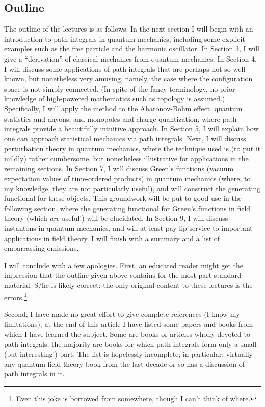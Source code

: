\documentclass[12pt]{article}
\begin{document}
\subsection{Outline}
The outline of the lectures is as follows. In the next section I will
begin with an introduction to path integrals in quantum mechanics,
including some explicit examples such as the free particle and the
harmonic oscillator. In Section 3, I will give a ``derivation'' of
classical mechanics from quantum mechanics. In Section 4, I will
discuss some applications of path integrals that are perhaps not so
well-known, but nonetheless very amusing, namely, the case where the
configuration space is not simply connected. (In spite of the fancy
terminology, no prior knowledge of high-powered mathematics such as
topology is assumed.) Specifically, I will apply the method to the
Aharonov-Bohm effect, quantum statistics and anyons, and monopoles and
charge quantization, where path integrals provide a beautifully
intuitive approach. In Section 5, I will explain how one can approach
statistical mechanics via path integrals. Next, I will discuss
perturbation theory in quantum mechanics, where the technique used is
(to put it mildly) rather cumbersome, but nonetheless
illustrative for applications in the remaining
sections. In Section 7, I will discuss Green's functions (vacuum
expectation values of time-ordered products) in quantum mechanics
(where, to my knowledge, they are not particularly useful), and will
construct the generating functional for these objects. This groundwork
will be put to good use in the following section, where the generating
functional for Green's functions in field theory (which {\em are}
useful!) will be elucidated. In Section 9, I will discuss instantons
in quantum mechanics, and will at least pay lip service to important
applications in field theory. I will finish with a summary and a list of
embarrassing omissions.

\vspace{1cm}
I will conclude with a few apologies.
First, an educated reader might get the impression that the outline
given above contains for the most part standard material. S/he is
likely correct: the only original content to these lectures is the
errors.\footnote{Even this joke is borrowed from somewhere, though
I can't think of where.}

Second, I have made no great
effort to give complete references (I know my limitations); 
at the end of this article I have listed some papers and
books from which I have learned the subject. Some are books or
articles wholly devoted to path integrals; the majority are books for
which path integrals form only a small (but interesting!)
part. The list is
hopelessly incomplete; in particular, virtually any quantum field
theory book from the last decade or so has a discussion of path
integrals in it.
\end{document}
